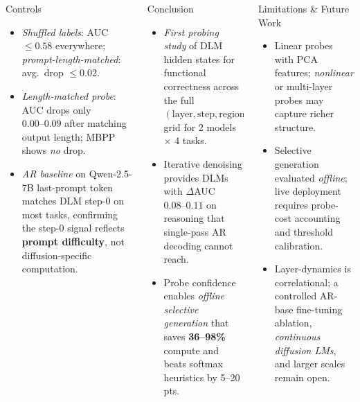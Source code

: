 \documentclass[final,t]{beamer}
\newlength{\colw}
\newlength{\gutter}
\newlength{\sidemargin}
\begin{document}
\begin{frame}[t]
\vfill

\begin{columns}[T]
\hspace{\sidemargin}
\begin{column}{\colw}
\begin{block}{Controls}
\begin{itemize}\setlength\itemsep{0.9ex}
  \item \emph{Shuffled labels}: AUC $\le 0.58$ everywhere; \emph{prompt-length-matched}: avg.\ drop $\le 0.02$.
  \item \emph{Length-matched probe}: AUC drops only $0.00\text{--}0.09$ after matching output length; MBPP shows \emph{no} drop.
  \item \emph{AR baseline} on Qwen-2.5-7B last-prompt token matches DLM step-0 on most tasks, confirming the step-0 signal reflects \textbf{prompt difficulty}, not diffusion-specific computation.
\end{itemize}
\end{block}
\end{column}
\hspace{\gutter}
\begin{column}{\colw}
\begin{block}{Conclusion}
\begin{itemize}\setlength\itemsep{0.9ex}
  \item \emph{First probing study} of DLM hidden states for functional correctness across the full $(\text{layer}, \text{step}, \text{region})$ grid for 2 models $\times$ 4 tasks.
  \item Iterative denoising provides DLMs with $\Delta$AUC $0.08\text{--}0.11$ on reasoning that single-pass AR decoding cannot reach.
  \item Probe confidence enables \emph{offline selective generation} that saves \textbf{36--98\%} compute and beats softmax heuristics by 5--20 pts.
\end{itemize}
\end{block}
\end{column}
\hspace{\gutter}
\begin{column}{\colw}
\begin{block}{Limitations \& Future Work}
\begin{itemize}\setlength\itemsep{0.9ex}
  \item Linear probes with PCA features; \emph{nonlinear} or multi-layer probes may capture richer structure.
  \item Selective generation evaluated \emph{offline}; live deployment requires probe-cost accounting and threshold calibration.
  \item Layer-dynamics is correlational; a controlled AR-base fine-tuning ablation, \emph{continuous diffusion LMs}, and larger scales remain open.
\end{itemize}
\end{block}
\end{column}
\hspace{\sidemargin}
\end{columns}


\end{frame}
\end{document}
